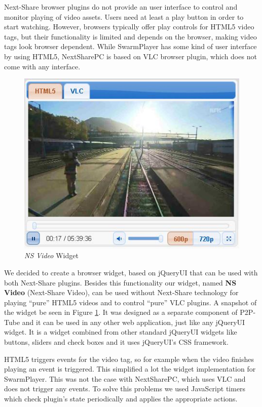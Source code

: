 Next-Share browser plugins do not provide an user interface to control and monitor playing of video assets. Users need at least a play button in order to start watching. However, browsers typically offer play controls for HTML5 video tags, but their functionality is limited and depends on the browser, making video tags look browser dependent. While SwarmPlayer has some kind of user interface by using HTML5, NextSharePC is based on VLC browser plugin, which does not come with any interface.

\begin{figure}[h]
  \begin{center}
    \includegraphics[width=\columnwidth]{img/nsvideo-widget.jpg}
  \end{center}
  \caption{\textit{NS Video} Widget}
  \label{fig:nsvideo-widget}
\end{figure}

We decided to create a browser widget, based on jQueryUI that can be used with both Next-Share plugins. Besides this functionality our widget, named \textbf{NS Video} (Next-Share Video), can be used without Next-Share technology for playing ``pure'' HTML5 videos and to control ``pure'' VLC plugins. A snapshot of the widget be seen in Figure \ref{fig:nsvideo-widget}. It was designed as a separate component of P2P-Tube and it can be used in any other web application, just like any jQueryUI widget. It is a widget combined from other standard jQueryUI widgets like buttons, sliders and check boxes and it uses jQueryUI's CSS framework.

HTML5 triggers events for the video tag, so for example when the video finishes playing an event is triggered. This simplified a lot the widget implementation for SwarmPlayer. This was not the case with NextSharePC, which uses VLC and does not trigger any events. To solve this problems we used JavaScript timers which check plugin's state periodically and applies the appropriate actions.

